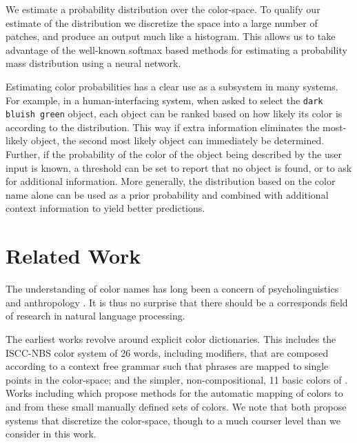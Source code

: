 \documentclass[11pt,a4paper]{article}
\newcommand{\parencite}{\citep}
\newcommand{\textcite}{\citet}
\begin{document}
We estimate a probability distribution over the color-space.
To qualify our estimate of the distribution we discretize the space into a large number of patches, and produce an output much like a histogram.
This allows us to take advantage of the well-known softmax based methods for estimating a probability mass distribution using a neural network.


Estimating color probabilities has a clear use as a subsystem in many systems.
For example, in a human-interfacing system, when asked to select the \texttt{dark bluish green} object, each object can be ranked based on how likely its color is according to the distribution.
This way if extra information eliminates the most-likely object, the second most likely object can immediately be determined.
Further, if the probability of the color of the object being described by the user input is known, a threshold can be set to report that no object is found, or to ask for additional information.
More generally, the distribution based on the color name alone can be used as a prior probability and combined with additional context information to yield better predictions.





\section{Related Work}\label{sec:related-work}
The understanding of color names has long been a concern of psycholinguistics and anthropology  \parencite{berlin1969basic,heider1972universals,HEIDER1972337,mylonas2015use}.
It is thus no surprise that there should be a corresponds field of research in natural language processing.

The earliest works revolve around explicit color dictionaries.
This includes the ISCC-NBS color system \parencite{kelly1955iscc} of 26 words, including modifiers, that are composed according to a context free grammar such that phrases are mapped to single points in the color-space;
and the simpler, non-compositional, 11 basic colors of \textcite{berlin1969basic}.
Works including \textcite{Berk:1982:HFS:358589.358606,conway1992experimental,ele1994computational, mojsilovic2005computational, menegaz2007discrete,van2009learning} which propose methods for the automatic mapping of colors to and from these small manually defined sets of colors.
We note that \textcite{menegaz2007discrete,van2009learning} both propose systems that discretize the color-space, though to a much courser level than we consider in this work.
\end{document}
